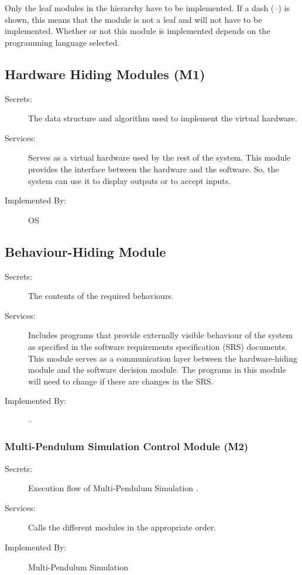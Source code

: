\documentclass[12pt, titlepage]{article}
\newcommand{\mref}[1]{M\ref{#1}}
\newcommand{\progname}{Multi-Pendulum Simulation }
\begin{document}
Only the leaf modules in the
hierarchy have to be implemented. If a dash (\emph{--}) is shown, this means
that the module is not a leaf and will not have to be implemented. Whether or
not this module is implemented depends on the programming language
selected.

\subsection{Hardware Hiding Modules (M1)}%

\begin{description}
\item[Secrets:]The data structure and algorithm used to implement the virtual
  hardware.
\item[Services:]Serves as a virtual hardware used by the rest of the
  system. This module provides the interface between the hardware and the
  software. So, the system can use it to display outputs or to accept inputs.
\item[Implemented By:] OS
\end{description}

\subsection{Behaviour-Hiding Module}

\begin{description}
\item[Secrets:]The contents of the required behaviours.
\item[Services:]Includes programs that provide externally visible behaviour of
  the system as specified in the software requirements specification (SRS)
  documents. This module serves as a communication layer between the
  hardware-hiding module and the software decision module. The programs in this
  module will need to change if there are changes in the SRS.
\item[Implemented By:] --
\end{description}

\subsubsection{\progname{}Control Module (M2)}
\label{MG_Control}
\begin{description}
\item[Secrets:] Execution flow of \progname{}.  
\item[Services:] Calls the different modules in the appropriate order.
\item[Implemented By:] \progname{}
\end{description}
\end{document}
